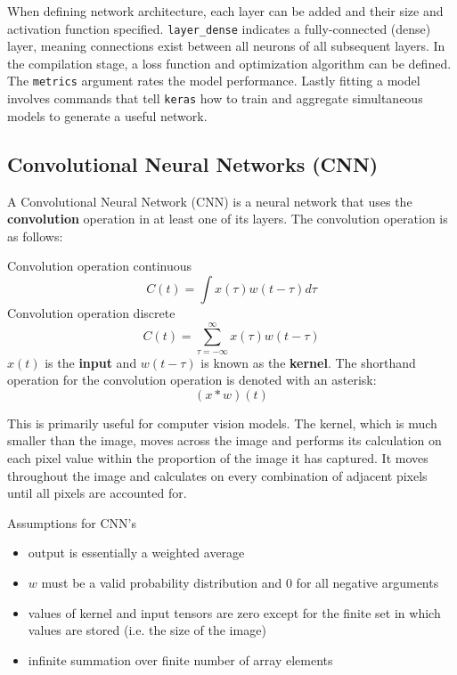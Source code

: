 When defining network architecture, each layer can be added and their
size and activation function specified. \texttt{layer\_dense} indicates
a fully-connected (dense) layer, meaning connections exist between all
neurons of all subsequent layers. In the compilation stage, a loss
function and optimization algorithm can be defined. The \texttt{metrics}
argument rates the model performance. Lastly fitting a model involves
commands that tell \texttt{keras} how to train and aggregate
simultaneous models to generate a useful network.

\hypertarget{convolutional-neural-networks-cnn}{%
\subsection{Convolutional Neural Networks
(CNN)}\label{convolutional-neural-networks-cnn}}

A Convolutional Neural Network (CNN) is a neural network that uses the \textbf{convolution} operation in at least one of its layers.  The convolution operation is as follows:

Convolution operation continuous \[
C(t) = \int x(\tau)w(t - \tau)d\tau
\] Convolution operation discrete \[
C(t) = \sum_{\tau = -\infty}^\infty x(\tau)w(t - \tau)
\] \(x(t)\) is the \textbf{input} and \(w(t-\tau)\) is known as the
\textbf{kernel}. The shorthand operation for the convolution operation
is denoted with an asterisk: \[
(x * w)(t)
\]

This is primarily useful for computer vision models.  The kernel, which is much smaller than the image, moves across the image and performs its calculation on each pixel value within the proportion of the image it has captured.  It moves throughout the image and calculates on every combination of adjacent pixels until all pixels are accounted for.

Assumptions for CNN's \cite{Goodfellow-et-al-2016}
\begin{itemize}
\tightlist
\item{output is essentially a weighted average}
\item{\(w\) must be a valid probability distribution and 0 for all negative arguments}
\item{values of kernel and input tensors are zero except for the finite set in which values are stored (i.e. the size of the image)}
\item{infinite summation over finite number of array elements}
\end{itemize}

